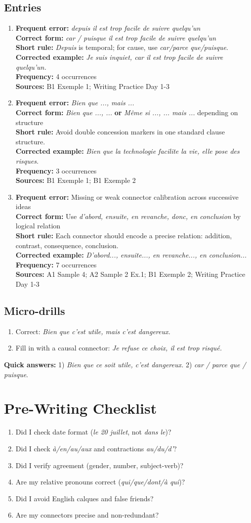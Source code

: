 \documentclass{article}
\newcommand{\mistakeentry}[6]{
\item \textbf{Frequent error:} #1\\
\textbf{Correct form:} #2\\
\textbf{Short rule:} #3\\
\textbf{Corrected example:} #4\\
\textbf{Frequency:} #5\\
\textbf{Sources:} #6
}
\begin{document}
\subsection*{Entries}
\begin{enumerate}
    \mistakeentry
    {\textit{depuis il est trop facile de suivre quelqu'un}}
    {\textit{car / puisque il est trop facile de suivre quelqu'un}}
    {\textit{Depuis} is temporal; for cause, use \textit{car/parce que/puisque}.}
    {\textit{Je suis inquiet, car il est trop facile de suivre quelqu'un.}}
    {4 occurrences}
    {B1 Exemple 1; Writing Practice Day 1-3}

    \mistakeentry
    {\textit{Bien que ..., mais ...}}
    {\textit{Bien que ..., ...} \textbf{or} \textit{Même si ..., ... mais ...} depending on structure}
    {Avoid double concession markers in one standard clause structure.}
    {\textit{Bien que la technologie facilite la vie, elle pose des risques.}}
    {3 occurrences}
    {B1 Exemple 1; B1 Exemple 2}

    \mistakeentry
    {Missing or weak connector calibration across successive ideas}
    {Use \textit{d'abord, ensuite, en revanche, donc, en conclusion} by logical relation}
    {Each connector should encode a precise relation: addition, contrast, consequence, conclusion.}
    {\textit{D'abord..., ensuite..., en revanche..., en conclusion...}}
    {7 occurrences}
    {A1 Sample 4; A2 Sample 2 Ex.1; B1 Exemple 2; Writing Practice Day 1-3}
\end{enumerate}

\subsection*{Micro-drills}
\begin{enumerate}
    \item Correct: \textit{Bien que c'est utile, mais c'est dangereux.}
    \item Fill in with a causal connector: \textit{Je refuse ce choix, \underline{\hspace{1cm}} il est trop risqué.}
\end{enumerate}
\textbf{Quick answers:} 1) \textit{Bien que ce soit utile, c'est dangereux.} 2) \textit{car / parce que / puisque}.

\section{Pre-Writing Checklist}
\begin{enumerate}
    \item Did I check date format (\textit{le 20 juillet}, not \textit{dans le})?
    \item Did I check \textit{à/en/au/aux} and contractions \textit{au/du/d'}?
    \item Did I verify agreement (gender, number, subject-verb)?
    \item Are my relative pronouns correct (\textit{qui/que/dont/à qui})?
    \item Did I avoid English calques and false friends?
    \item Are my connectors precise and non-redundant?
\end{enumerate}
\end{document}
